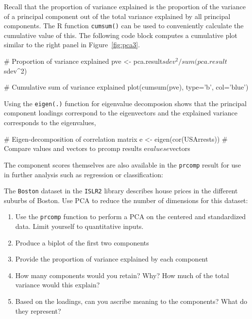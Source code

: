 \begin{withcode}
\noindent Recall that the proportion of variance explained is the proportion of the variance of a principal component out of the total variance explained by all principal components. The R function \texttt{cumsum()} can be used to conveniently calculate the cumulative value of this. The following code block computes a cumulative plot similar to the right panel in Figure~\ref{fig:pca3}.

\begin{Rcode}
# Proportion of variance explained
pve <- pca.result$sdev^2 / sum(pca.result$sdev^2)

# Cumulative sum of variance explained
plot(cumsum(pve), type='b', col='blue')
\end{Rcode}

\noindent Using the \texttt{eigen(.)} function for eigenvalue decomposion shows that the principal component loadings correspond to the eigenvectors and the explained variance corresponds to the eigenvalues, 

\begin{Rcode}
# Eigen-decomposition of correlation matrix
e <- eigen(cor(USArrests))
# Compare values and vectors to prcomp results
e$values
e$vectors
\end{Rcode}


\noindent The component scores themselves are also available in the \texttt{prcomp} result for use in further analysis such as regression or classification:


\begin{exerciseboxcomputer}

The \texttt{Boston} dataset in the \texttt{ISLR2} library describes house prices in the different suburbs of Boston. Use PCA to reduce the number of dimensions for this dataset:
\begin{enumerate}
   \item Use the \texttt{prcomp} function to perform a PCA on the centered and standardized data. Limit yourself to quantitative inputs.
   \item Produce a biplot of the first two components
   \item Provide the proportion of variance explained by each component
   \item How many components would you retain? Why? How much of the total variance would this explain?
   \item Based on the loadings, can you ascribe meaning to the components? What do they represent?
\end{enumerate}
\end{exerciseboxcomputer}


\end{withcode}
